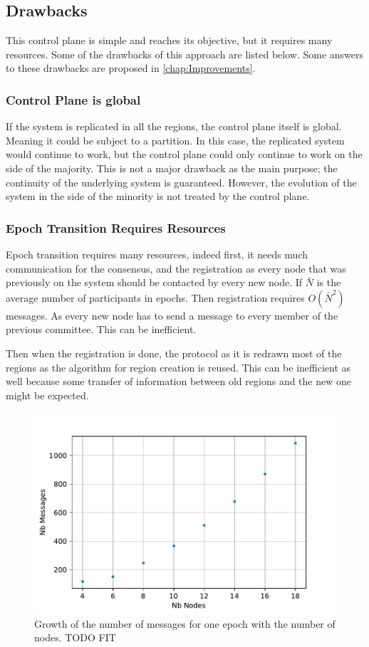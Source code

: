 \documentclass[a4paper,11pt,oneside]{report}
\begin{document}
\subsection{Drawbacks}
This control plane is simple and reaches its objective, but it requires many
resources. Some of the drawbacks of this approach are listed below. 
Some answers to these drawbacks are proposed in \autoref{chap:Improvements}.  

\subsubsection{Control Plane is global}
If the system is replicated in all the regions, the control plane itself is
global. Meaning it could be subject to a partition. In this case, the replicated
system would continue to work, but the control plane could only continue to
work on the side of the majority. This is not a major drawback as the main
purpose; the continuity of the underlying system is guaranteed. However, the
evolution of the system in the side of the minority is not treated by the
control plane.

\subsubsection{Epoch Transition Requires Resources}
Epoch transition requires many resources, indeed first, it needs much
communication for the consensus, and the registration as every node that was
previously on the system should be contacted by every new node. If $\bar{N}$ is
the average number of participants in epochs. Then registration 
requires $O(\bar{N}^2)$ messages. As every new node has to send a message
to every member of the previous committee. This can be inefficient. 

Then when the registration is done, the protocol as it is redrawn most of
the regions as the algorithm for region creation is reused. This can be
inefficient as well because some transfer of information between old regions
and the new one might be expected.

\begin{figure}[!h] 
\centering
\includegraphics[width=350pt]{figures/messages-plot}
\caption{Growth of the number of messages for one epoch with the number of nodes. \color{red} TODO FIT \color{black}}
\label{fig:messages-plot}
\end{figure}
\end{document}
